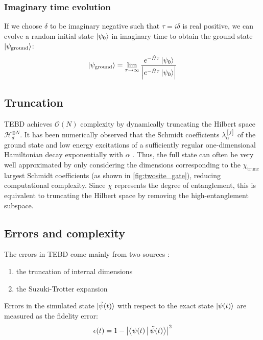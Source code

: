 \documentclass[a4paper, headsepline, footheight=13.6pt]{scrartcl}
\begin{document}
\subsubsection{Imaginary time evolution}
If we choose $\delta$ to be imaginary negative such that $\tau=i\delta$ is real positive, we can evolve a random initial state $\ket{\psi_0}$ in imaginary time to obtain the ground state $\ket{\psi_\text{ground}}$:
\begin{equation} \label{eq:imag_time_evol}
    \ket{\psi_\text{ground}} = \lim_{\tau \rightarrow \infty} \frac{e^{-\hat{H}\tau}\ket{\psi_0}}{\left|e^{-\hat{H}\tau}\ket{\psi_0}\right|}
\end{equation}

\subsection{Truncation}
TEBD achieves $\mathcal{O}(N)$ complexity by dynamically truncating the Hilbert space $\mathcal{H}^{\otimes N}_d$.  It has been numerically observed that the Schmidt coefficients $\lambda^{[j]}_\alpha$ of the ground state and low energy excitations of a sufficiently regular one-dimensional Hamiltonian decay exponentially with $\alpha$ \cite{Vidal:2004aa}. Thus, the full state can often be very well approximated by only considering the dimensions corresponding to the $\chi_\text{trunc}$ largest Schmidt coefficients (as shown in \autoref{fig:twosite_gate}), reducing computational complexity. Since $\chi$ represents the degree of entanglement, this is equivalent to truncating the Hilbert space by removing the high-entanglement subspace.

\subsection{Errors and complexity}
The errors in TEBD come mainly from two sources \cite{Vidal:2004aa}:
\begin{enumerate}
    \item the truncation of internal dimensions
    \item the Suzuki-Trotter expansion
\end{enumerate}
Errors in the simulated state $\ket{\tilde{\psi}(t)}$ with respect to the exact state $\ket{\psi(t)}$ are measured as the fidelity error:
\begin{equation}
    \epsilon(t) = 1-\left|\Braket{\psi(t)|\tilde{\psi}(t)}\right|^2
\end{equation}
\end{document}
